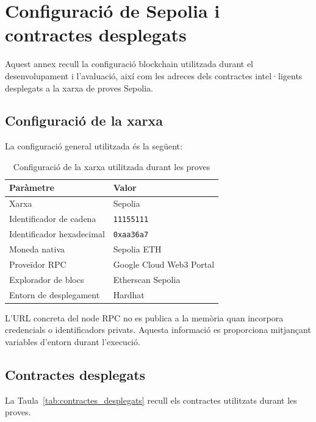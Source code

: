 \section{Configuració de Sepolia i contractes desplegats}
\label{annex:sepolia}

Aquest annex recull la configuració blockchain utilitzada durant el desenvolupament i l’avaluació, així com les adreces dels contractes intel·ligents desplegats a la xarxa de proves Sepolia.

\subsection{Configuració de la xarxa}

La configuració general utilitzada és la següent:

\begin{table}[htbp]
\centering
\renewcommand{\arraystretch}{1.2}
\begin{tabularx}{\textwidth}{p{} X}
\hline
\textbf{Paràmetre} & \textbf{Valor} \\
\hline
Xarxa & Sepolia \\
Identificador de cadena & \texttt{11155111} \\
Identificador hexadecimal & \texttt{0xaa36a7} \\
Moneda nativa & Sepolia ETH \\
Proveïdor RPC & Google Cloud Web3 Portal \\
Explorador de blocs & Etherscan Sepolia \\
Entorn de desplegament & Hardhat \\
\hline
\end{tabularx}
\caption{Configuració de la xarxa utilitzada durant les proves}
\label{tab:configuracio_sepolia_annex}
\end{table}

L’URL concreta del node RPC no es publica a la memòria quan incorpora credencials o identificadors privats. Aquesta informació es proporciona mitjançant variables d’entorn durant l’execució.

\subsection{Contractes desplegats}

La Taula~\ref{tab:contractes_desplegats} recull els contractes utilitzats durant les proves.

